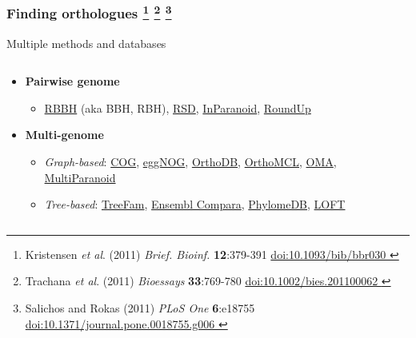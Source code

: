 \begin{frame}
  \frametitle{Finding orthologues
    \footnote{\tiny{Kristensen \textit{et al}. (2011) \textit{Brief. Bioinf.} \textbf{12}:379-391 \href{http://dx.doi.org/10.1093/bib/bbr030}{doi:10.1093/bib/bbr030
    }}}
    \footnote{\tiny{Trachana \textit{et al}. (2011) \textit{Bioessays} \textbf{33}:769-780 \href{http://dx.doi.org/10.1002/bies.201100062}{doi:10.1002/bies.201100062
    }}}
    \footnote{\tiny{Salichos and Rokas (2011) \textit{PLoS One} \textbf{6}:e18755 \href{http://dx.doi.org/10.1371/journal.pone.0018755.g006}{doi:10.1371/journal.pone.0018755.g006
    }}}
  }
  Multiple methods and databases
  \begin{columns}[T]    \begin{column}{6cm}
      \begin{itemize}
        \item \textcolor{hutton_green}{\textbf{Pairwise genome}}
        \begin{itemize}
          \item \href{http://armchairbiology.blogspot.co.uk/2012/07/on-reciprocal-best-blast-hits.html}{RBBH} (aka BBH, RBH), \href{http://link.springer.com/protocol/10.1007/978-1-59745-515-2_7}{RSD}, \href{http://inparanoid.sbc.su.se/cgi-bin/index.cgi}{InParanoid}, \href{http://roundup.hms.harvard.edu/}{RoundUp}
        \end{itemize}
        \item \textcolor{hutton_blue}{\textbf{Multi-genome}}
        \begin{itemize}
          \item \textit{Graph-based}: \href{http://www.ncbi.nlm.nih.gov/COG/}{COG}, \href{http://eggnog.embl.de/}{eggNOG}, \href{http://cegg.unige.ch/orthodb7}{OrthoDB}, \href{http://orthomcl.org/orthomcl/}{OrthoMCL}, \href{http://omabrowser.org/cgi-bin/gateway.pl}{OMA}, \href{http://multiparanoid.sbc.su.se/}{MultiParanoid}
          \item \textit{Tree-based}: \href{http://www.treefam.org/}{TreeFam}, \href{http://www.ensembl.org/info/genome/compara/index.html}{Ensembl Compara}, \href{http://phylomedb.org/}{PhylomeDB}, \href{https://trac.nbic.nl/loft/}{LOFT}
        \end{itemize}
      \end{itemize}
    \end{column}
    \begin{column}{4cm}

\end{column}
\end{columns}
\end{frame}
